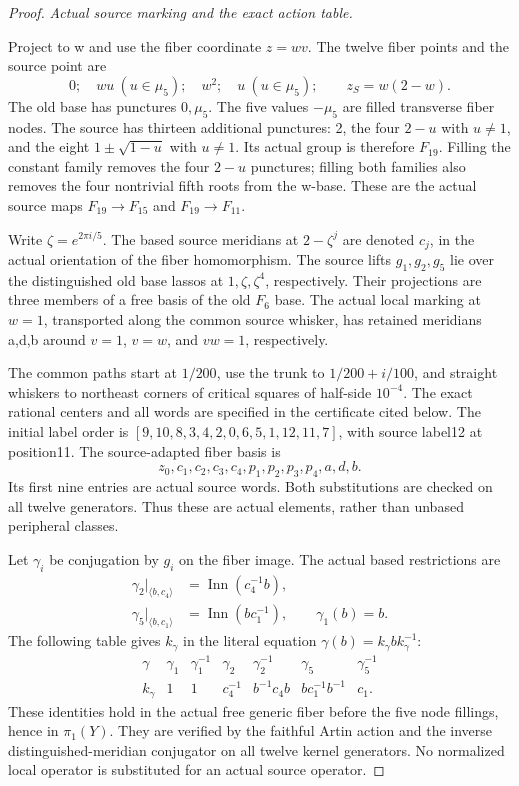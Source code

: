 \begin{proof}
\emph{Actual source marking and the exact action table.}\par
Project to w and use the fiber coordinate \(z=wv\). The twelve
fiber points and the source point are
\[
 0;\quad wu\ (u\in\mu _5);\quad w^2;\quad
 u\ (u\in\mu _5);\qquad z_S=w(2-w).
\tag{B.83.6}
\]
The old base has punctures \(0,\mu _5\). The five values
\(-\mu _5\) are filled transverse fiber nodes. The source has
thirteen additional punctures: 2, the four \(2-u\) with
\(u\ne1\), and the eight \(1\pm\sqrt{1-u}\) with \(u\ne1\).
Its actual group is therefore \(F_{19}\). Filling the constant
family removes the four \(2-u\) punctures; filling both families
also removes the four nontrivial fifth roots from the w-base.
These are the actual source maps \(F_{19}\to F_{15}\) and
\(F_{19}\to F_{11}\).

Write \(\zeta=e^{2\pi i/5}\). The based source meridians at
\(2-\zeta^j\) are denoted \(c_j\), in the actual orientation
of the fiber homomorphism. The source lifts \(g_1,g_2,g_5\)
lie over the distinguished old base lassos at
\(1,\zeta,\zeta^4\), respectively. Their projections are three
members of a free basis of the old \(F_6\) base. The actual
local marking at \(w=1\), transported along the common source
whisker, has retained meridians a,d,b around \(v=1\), \(v=w\),
and \(vw=1\), respectively.

The common paths start at \(1/200\), use the trunk to
\(1/200+i/100\), and straight whiskers to northeast corners
of critical squares of half-side \(10^{-4}\). The exact rational
centers and all words are specified in the certificate cited below.
The initial label order is
\([9,10,8,3,4,2,0,6,5,1,12,11,7]\), with source label12
at position11. The source-adapted fiber basis is
\[
 z_0,c_1,c_2,c_3,c_4,p_1,p_2,p_3,p_4,a,d,b.
\tag{B.83.7}
\]
Its first nine entries are actual source words. Both substitutions
are checked on all twelve generators. Thus these are actual
elements, rather than unbased peripheral classes.

Let \(\gamma_i\) be conjugation by \(g_i\) on the fiber image.
The actual based restrictions are
\[
\begin{split}
 \gamma_2|_{\langle b,c_4\rangle}
        &=\operatorname{Inn}(c_4^{-1}b),\\
 \gamma_5|_{\langle b,c_1\rangle}
        &=\operatorname{Inn}(bc_1^{-1}),\qquad
 \gamma_1(b)=b.
\end{split}
\tag{B.83.8}
\]
The following table gives \(k_\gamma\) in the literal equation
\(\gamma(b)=k_\gamma b k_\gamma^{-1}\):
\[
\begin{array}{c|cccccc}
\gamma&\gamma_1&\gamma_1^{-1}&\gamma_2&\gamma_2^{-1}
             &\gamma_5&\gamma_5^{-1}\\ \hline
k_\gamma&1&1&c_4^{-1}&b^{-1}c_4b
             &bc_1^{-1}b^{-1}&c_1.
\end{array}
\tag{B.83.9}
\]
These identities hold in the actual free generic fiber before
the five node fillings, hence in \(\pi _1(Y)\). They are verified
by the faithful Artin action and the inverse distinguished-meridian
conjugator on all twelve kernel generators. No normalized local
operator is substituted for an actual source operator.


\end{proof}
